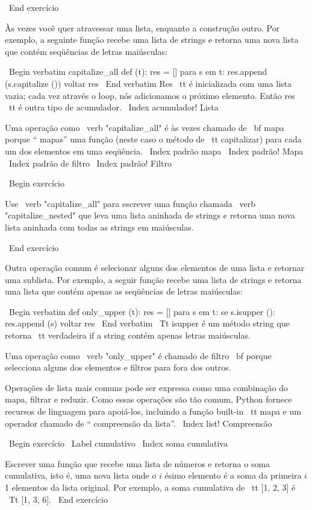 \documentclass[10pt]{book}
\begin{document}
{{{{{{\ End {} exercício

Às vezes você quer atravessar uma lista, enquanto a construção
outro. Por exemplo, a seguinte função recebe uma lista de strings
e retorna uma nova lista que contém seqüências de letras maiúsculas:

\ Begin {verbatim}
capitalize_all def (t):
    res = []
    para s em t:
        res.append (s.capitalize ())
    voltar res
\ End {verbatim}
%
{Res \ tt} é inicializada com uma lista vazia; cada vez através
o loop, nós adicionamos o próximo elemento. Então {res \ tt} é outra
tipo de acumulador.
\ Index {acumulador! Lista}

Uma operação como \ verb "capitalize_all" é às vezes chamado de {\ bf
mapa} porque `` mapas'' uma função (neste caso o método de {\ tt
capitalizar}) para cada um dos elementos em uma seqüência.
\ Index {padrão mapa}
\ Index {padrão! Mapa}
\ Index {padrão de filtro}
\ Index {padrão! Filtro}

\ Begin {} exercício

Use \ verb "capitalize_all" para escrever uma função chamada \ verb "capitalize_nested"
que leva uma lista aninhada de strings e retorna uma nova lista aninhada
com todas as strings em maiúsculas.

\ End {} exercício

Outra operação comum é selecionar alguns dos elementos de
uma lista e retornar uma sublista. Por exemplo, a seguir
função recebe uma lista de strings e retorna uma lista que contém
apenas as seqüências de letras maiúsculas:

\ Begin {verbatim}
def only_upper (t):
    res = []
    para s em t:
        se s.isupper ():
            res.append (s)
    voltar res
\ End {verbatim}
%
{\ Tt isupper} é um método string que retorna {\ tt verdadeira} if
a string contém apenas letras maiúsculas.

Uma operação como \ verb "only_upper" é chamado de filtro {\ bf} porque
selecciona alguns dos elementos e filtros para fora dos outros.

Operações de lista mais comuns pode ser expressa como uma combinação
do mapa, filtrar e reduzir. Como essas operações são
tão comum, Python fornece recursos de linguagem para apoiá-los,
incluindo a função built-in {\ tt mapa} e um operador
chamado de `` compreensão da lista''.
\ Index {list! Compreensão}

\ Begin {} exercício
\ Label {} cumulativo
\ Index {soma cumulativa}

Escrever uma função que recebe uma lista de números e retorna o
soma cumulativa, isto é, uma nova lista onde o $ i $ ésimo elemento
é a soma da primeira $ i $ 1 elementos da lista original.
Por exemplo, a soma cumulativa de {\ tt [1, 2, 3]} é
{\ Tt [1, 3, 6]}. 
\ End {} exercício


}}}}}}
\end{document}
